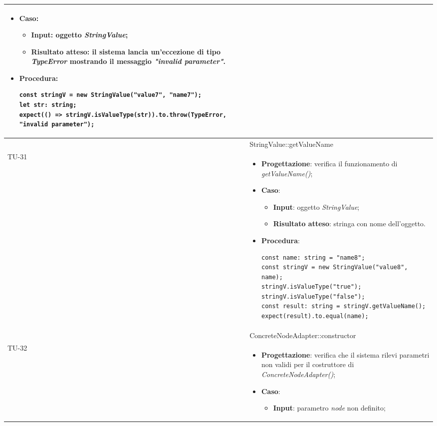 \begin{longtable}{|C{1.5cm}|C{14.5cm}|}
\begin{itemize}
		\item \textbf{Caso}: 
		\begin{itemize}
			\item \textbf{Input}: oggetto \emph{StringValue};
			\item \textbf{Risultato atteso}: il sistema lancia un'eccezione di tipo \emph{TypeError} mostrando il messaggio \emph{"invalid parameter"}.
		\end{itemize}
		\item \textbf{Procedura}:
		\begin{lstlisting}
const stringV = new StringValue("value7", "name7");
let str: string;
expect(() => stringV.isValueType(str)).to.throw(TypeError, "invalid parameter");
		\end{lstlisting}
	\end{itemize}\\
	\hline
	 & StringValue::getValueName\\
	\hline
	{TU-31} &  
	\begin{itemize}
		\item \textbf{Progettazione}: verifica il funzionamento di \emph{getValueName()};
		\item \textbf{Caso}: 
		\begin{itemize}
			\item \textbf{Input}: oggetto \emph{StringValue};
			\item \textbf{Risultato atteso}: stringa con nome dell'oggetto.
		\end{itemize}
		\item \textbf{Procedura}:
		\begin{lstlisting}
const name: string = "name8";
const stringV = new StringValue("value8", name);
stringV.isValueType("true");
stringV.isValueType("false");
const result: string = stringV.getValueName();
expect(result).to.equal(name);
		\end{lstlisting}
	\end{itemize}\\
	\hline
	 & ConcreteNodeAdapter::constructor \\
	\hline
	{TU-32} &  
	\begin{itemize}
		\item \textbf{Progettazione}: verifica che il sistema rilevi parametri non validi per il costruttore di \emph{ConcreteNodeAdapter()};
		\item \textbf{Caso}: 
		\begin{itemize}
			\item \textbf{Input}: parametro \emph{node} non definito;

\end{itemize}
\end{itemize}
\end{longtable}
